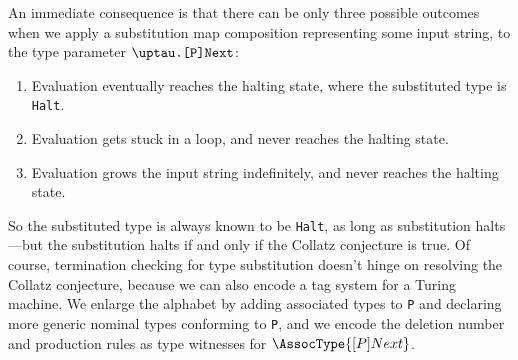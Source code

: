 \documentclass[../generics]{subfiles}
\begin{document}
An immediate consequence is that there can be only three possible outcomes when we apply a substitution map composition representing some input string, to the type parameter $\TNext$:
\begin{enumerate}
\item Evaluation eventually reaches the halting state, where the substituted type is \texttt{Halt}.
\item Evaluation gets stuck in a loop, and never reaches the halting state.
\item Evaluation grows the input string indefinitely, and never reaches the halting state.
\end{enumerate}
So the substituted type is always known to be \texttt{Halt}, as long as substitution halts---but the substitution halts if and only if the Collatz conjecture is true. Of course, termination checking for type substitution doesn't hinge on resolving the Collatz conjecture, because  we can also encode a tag system for a Turing machine. We enlarge the alphabet by adding associated types to \texttt{P} and declaring more generic nominal types conforming to \texttt{P}, and we encode the deletion number and production rules as type witnesses for $\AssocType{[P]Next}$. 

\eject
\end{document}
